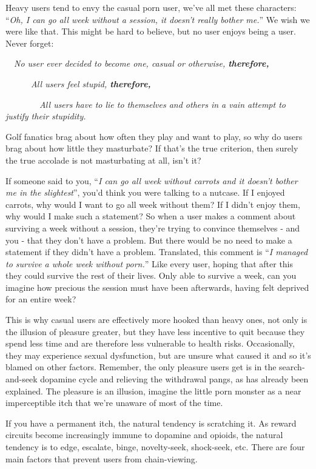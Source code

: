 \documentclass[
]{book}
\begin{document}
Heavy users tend to envy the casual porn user, we've all met these characters: ``\emph{Oh, I can go all week without a session, it doesn't really bother me.}'' We wish we were like that. This might be hard to believe, but no user enjoys being a user. Never forget:

~~\emph{No user ever decided to become one, casual or otherwise, \textbf{therefore,} }

~~~~~~\emph{All users feel stupid, \textbf{therefore,} }

~~~~~~~~\emph{All users have to lie to themselves and others in a vain attempt to justify their stupidity.}

Golf fanatics brag about how often they play and want to play, so why do users brag about how little they masturbate? If that's the true criterion, then surely the true accolade is not masturbating at all, isn't it?

If someone said to you, ``\emph{I can go all week without carrots and it doesn't bother me in the slightest}'', you'd think you were talking to a nutcase. If I enjoyed carrots, why would I want to go all week without them? If I didn't enjoy them, why would I make such a statement? So when a user makes a comment about surviving a week without a session, they're trying to convince themselves - and you - that they don't have a problem. But there would be no need to make a statement if they didn't have a problem. Translated, this comment is ``\emph{I managed to survive a whole week without porn.}'' Like every user, hoping that after this they could survive the rest of their lives. Only able to survive a week, can you imagine how precious the session must have been afterwards, having felt deprived for an entire week?

This is why casual users are effectively more hooked than heavy ones, not only is the illusion of pleasure greater, but they have less incentive to quit because they spend less time and are therefore less vulnerable to health risks. Occasionally, they may experience sexual dysfunction, but are unsure what caused it and so it's blamed on other factors. Remember, the only pleasure users get is in the search-and-seek dopamine cycle and relieving the withdrawal pangs, as has already been explained. The pleasure is an illusion, imagine the little porn monster as a near imperceptible itch that we're unaware of most of the time.

If you have a permanent itch, the natural tendency is scratching it. As reward circuits become increasingly immune to dopamine and opioids, the natural tendency is to edge, escalate, binge, novelty-seek, shock-seek, etc. There are four main factors that prevent users from chain-viewing.
\end{document}

